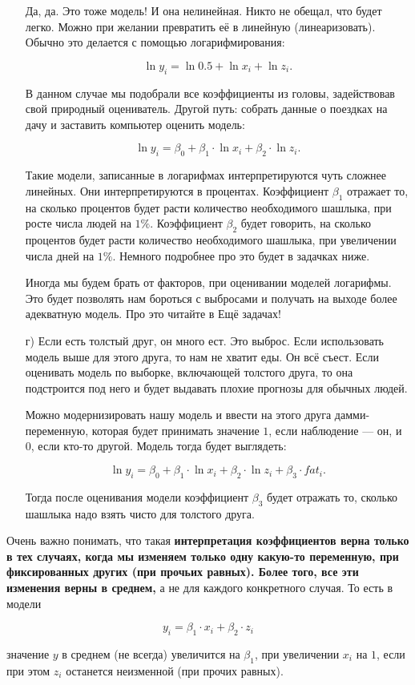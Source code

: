 \documentclass[12pt, a4paper, oneside]{article}
\theoremstyle{plain} %
\theoremstyle{definition}
\newcommand{\indef}[1]{\textbf{ \color{green} #1}}
\begin{document}
\begin{solution}
\begin{enumerate}
		Да, да. Это тоже модель! И она нелинейная. Никто не обещал, что будет легко. Можно при желании превратить её в линейную (линеаризовать). Обычно это делается с помощью логарифмирования: 
		
		\[ \ln y_i = \ln 0.5 + \ln x_i + \ln z_i.\]
		
		В данном случае мы подобрали все коэффициенты из головы, задействовав свой природный оцениватель. Другой путь: собрать данные о поездках на дачу и заставить компьютер оценить модель: 
		
		\[ \ln y_i = \beta_0 + \beta_1 \cdot \ln x_i + \beta_2 \cdot \ln z_i.\]
		
		Такие модели, записанные в логарифмах интерпретируются чуть сложнее линейных. Они интерпретируются в процентах. Коэффициент $\beta_1$ отражает то, на сколько процентов будет расти количество необходимого шашлыка, при росте числа людей на $1\%$. Коэффициент $\beta_2$ будет говорить, на сколько процентов будет расти количество необходимого шашлыка, при увеличении числа дней на $1\%$. Немного подробнее про это будет в задачках ниже.
		
		Иногда мы будем брать от факторов, при оценивании моделей логарифмы. Это будет позволять нам бороться с выбросами и получать на выходе более адекватную модель. Про это читайте в Ещё задачах! 
		
		\item[г)]   Если есть толстый друг, он много ест. Это выброс. Если использовать модель выше для этого друга, то нам не хватит еды. Он всё съест. Если оценивать модель по выборке, включающей толстого друга, то она подстроится под него и будет выдавать плохие прогнозы для обычных людей. 
		
		Можно модернизировать нашу модель и ввести на этого друга дамми-переменную, которая будет принимать значение $1$, если наблюдение --- он, и $0$, если кто-то другой. Модель тогда будет выглядеть: 
		
		\[ \ln y_i = \beta_0 + \beta_1 \cdot \ln x_i + \beta_2 \cdot \ln z_i + \beta_3 \cdot fat_i.\]
		
		Тогда после оценивания модели коэффициент $\beta_3$ будет отражать то, сколько шашлыка надо взять чисто для толстого друга.
		

	\end{enumerate}	
	
	Очень важно понимать, что такая \indef{интерпретация коэффициентов верна только в тех случаях, когда мы изменяем только одну какую-то переменную, при фиксированных других (при прочьих равных). Более того, все эти изменения верны в среднем,} а не для каждого конкретного случая. То есть в модели 
	
	\[ y_i = \beta_1 \cdot  x_i + \beta_2 \cdot  z_i \]
	
	значение $y$ в среднем (не всегда) увеличится на $\beta_1$, при увеличении $x_i$ на $1$, если при этом $z_i$ останется неизменной (при прочих равных).
\end{solution}
\end{document}
